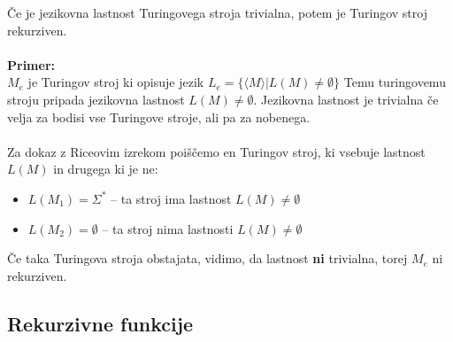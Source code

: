 \documentclass[a4paper]{article}
\begin{document}
\begin{multicols}{2}
Če je jezikovna lastnost Turingovega stroja trivialna, potem je Turingov stroj rekurziven.\\
\ \\
\textbf{Primer:}\\
$M_e$ je Turingov stroj ki opisuje jezik $L_e = \lbrace \langle M \rangle | L(M) \neq \emptyset \rbrace $
Temu turingovemu stroju pripada jezikovna lastnost $ L(M) \neq \emptyset $. 
Jezikovna lastnost je trivialna če velja za bodisi vse Turingove stroje, ali pa za nobenega.\\
\ \\
Za dokaz z Riceovim izrekom poiščemo en Turingov stroj, ki vsebuje lastnost $L(M)$ in drugega ki je ne:
\begin{itemize}
\item $L(M_1) = \Sigma^*$ -- ta stroj ima lastnost $ L(M) \neq \emptyset $
\item $L(M_2) = \emptyset $ -- ta stroj nima lastnosti $ L(M) \neq \emptyset $
\end{itemize}
Če taka Turingova stroja obstajata, vidimo, da lastnost \textbf{ni} trivialna, torej $M_e$ ni rekurziven.

\subsection*{Rekurzivne funkcije}
\begin{enumerate}


\end{enumerate}
\end{multicols}
\end{document}
